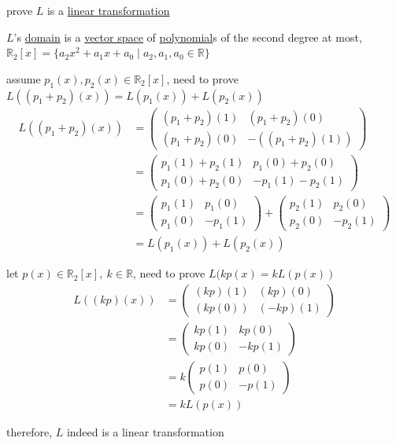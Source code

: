 \documentclass[a4paper,12pt]{article}
\begin{document}
\begin{definition}
\begin{question}
\begin{subquestion}
prove \(L\) is a \hyperref[sec:orgdf3d063]{linear transformation}\\
\begin{answer}
\(L\)'s \href{discrete_maths2.org}{domain} is a \hyperref[sec:orgea93933]{vector space} of \href{calculus2.org}{polynomial}s of the second degree at most, \(\mathbb{R}_2[x] = \{a_2x^2+a_1x+a_0 \mid a_2,a_1,a_0 \in \mathbb{R}\}\)\\
\begin{step}
assume \(p_1(x),p_2(x) \in \mathbb{R}_2[x]\), need to prove \(L((p_1+p_2)(x)) = L(p_1(x)) + L(p_2(x))\)\\
\begin{align*}
  L((p_1+p_2)(x)) &= \begin{pmatrix} (p_1+p_2)(1) & (p_1+p_2)(0)\\ (p_1+p_2)(0) & -((p_1+p_2)(1)) \end{pmatrix}\\
  &= \begin{pmatrix} p_1(1)+p_2(1) & p_1(0)+p_2(0)\\ p_1(0)+p_2(0) & -p_1(1)-p_2(1) \end{pmatrix}\\
  &= \begin{pmatrix} p_1(1) & p_1(0)\\ p_1(0) & -p_1(1) \end{pmatrix} + \begin{pmatrix} p_2(1) & p_2(0)\\ p_2(0) & -p_2(1) \end{pmatrix}\\
  &= L(p_1(x)) + L(p_2(x))
\end{align*}
\end{step}

\begin{step}
let \(p(x) \in \mathbb{R}_2[x],\ k \in \mathbb{R}\), need to prove \(L(kp(x) = kL(p(x))\)\\
\begin{align*}
  L((kp)(x)) &= \begin{pmatrix} (kp)(1) & (kp)(0)\\ (kp(0)) & (-kp)(1) \end{pmatrix}\\
  &= \begin{pmatrix} kp(1) & kp(0)\\ kp(0) & -kp(1) \end{pmatrix}\\
  &= k\begin{pmatrix} p(1) & p(0)\\ p(0) & -p(1) \end{pmatrix}\\
  &= kL(p(x))
\end{align*}
\end{step}
therefore, \(L\) indeed is a linear transformation\\
\end{answer}
\end{subquestion}


\end{question}
\end{definition}
\end{document}

